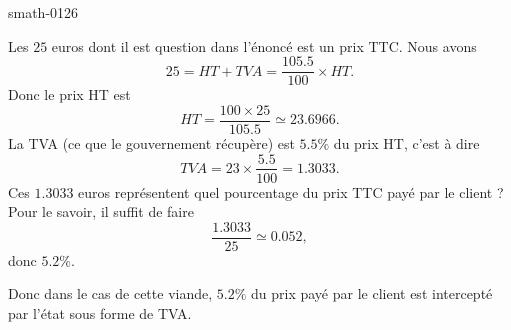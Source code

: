 
\begin{corrige}{smath-0126}

    Les \( 25\) euros dont il est question dans l'énoncé est un prix TTC. Nous avons
    \begin{equation}
        25=HT+TVA=\frac{ 105.5 }{ 100 }\times HT.
    \end{equation}
    Donc le prix HT est
    \begin{equation}
        HT=\frac{ 100\times 25 }{ 105.5 }\simeq 23.6966.
    \end{equation}
    La TVA (ce que le gouvernement récupère) est \( 5.5\%\) du prix HT, c'est à dire
    \begin{equation}
        TVA=23\times \frac{ 5.5 }{ 100 }=1.3033.
    \end{equation}
    Ces \( 1.3033\) euros représentent quel pourcentage du prix TTC payé par le client ? Pour le savoir, il suffit de faire
    \begin{equation}
        \frac{ 1.3033 }{ 25 }\simeq 0.052,
    \end{equation}
    donc \( 5.2\%\).

    Donc dans le cas de cette viande, \( 5.2\%\) du prix payé par le client est intercepté par l'état sous forme de TVA.

\end{corrige}
